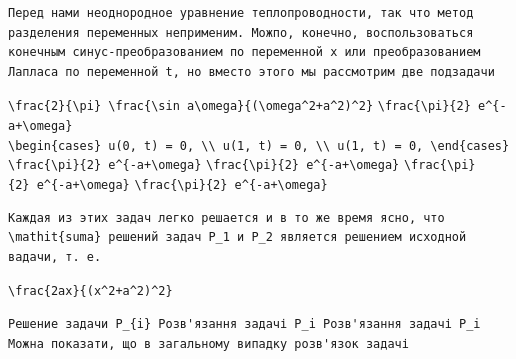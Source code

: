 \documentclass[
  ukrainian,
]{article}
\begin{document}
\begin{verbatim}
Перед нами неоднородное уравнение теплопроводности, так что метод разделения переменных неприменим. Можпо, конечно, воспользоваться конечным синус-преобразованием по переменной x или преобразованием Лапласа по переменной t, но вместо этого мы рассмотрим две подзадачи
\end{verbatim}

\texttt{\textbackslash{}frac\{2\}\{\textbackslash{}pi\}\ \textbackslash{}frac\{\textbackslash{}sin\ a\textbackslash{}omega\}\{(\textbackslash{}omega\^{}2+a\^{}2)\^{}2\}}
\texttt{\textbackslash{}frac\{\textbackslash{}pi\}\{2\}\ e\^{}\{-a+\textbackslash{}omega\}}
\texttt{\textbackslash{}begin\{cases\}\ u(0,\ t)\ =\ 0,\ \textbackslash{}\textbackslash{}\ u(1,\ t)\ =\ 0,\ \textbackslash{}\textbackslash{}\ u(1,\ t)\ =\ 0,\ \textbackslash{}end\{cases\}}
\texttt{\textbackslash{}frac\{\textbackslash{}pi\}\{2\}\ e\^{}\{-a+\textbackslash{}omega\}}
\texttt{\textbackslash{}frac\{\textbackslash{}pi\}\{2\}\ e\^{}\{-a+\textbackslash{}omega\}}
\texttt{\textbackslash{}frac\{\textbackslash{}pi\}\{2\}\ e\^{}\{-a+\textbackslash{}omega\}}
\texttt{\textbackslash{}frac\{\textbackslash{}pi\}\{2\}\ e\^{}\{-a+\textbackslash{}omega\}}

\begin{verbatim}
Каждая из этих задач легко решается и в то же время ясно, что \mathit{suma} решений задач P_1 и P_2 является решением исходной вадачи, т. е.
\end{verbatim}

\texttt{\textbackslash{}frac\{2ax\}\{(x\^{}2+a\^{}2)\^{}2\}}

\begin{verbatim}
Решение задачи P_{i} Розв'язання задачі P_i Розв'язання задачі P_i Можна показати, що в загальному випадку розв'язок задачі
\end{verbatim}
\end{document}
